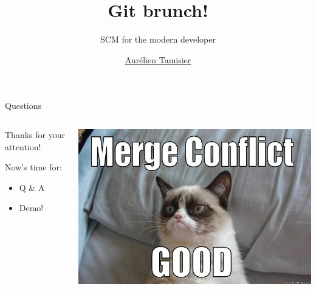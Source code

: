 \documentclass{beamer}
\title{Git brunch!}
\subtitle{SCM for the modern developer}
\author{\href{mailto://virtualtam@flibidi.net}{Aurélien Tamisier}}
\institute{The Internet}
\begin{document}
\frame{\titlepage}







\begin{frame}{Questions}
  \begin{columns}[t]
    \begin{column}{0.4\textwidth}
      Thanks for your attention!

      Now's time for:
      \begin{itemize}
      \item Q \& A
      \item Demo!
      \end{itemize}
    \end{column}
    \begin{column}{0.6\textwidth}
      \begin{center}
        \includegraphics[width=\textwidth]{img/gitgrumpy.jpg}
      \end{center}
    \end{column}
  \end{columns}
\end{frame}

%
\end{document}
